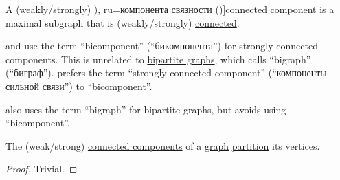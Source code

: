 \begin{definition}\label{def:graph_connected_component}
  A (weakly/strongly) \term[bg=компонента (\cite[15]{Мирчев2001Графи}), ru=компонента связности (\cite[286]{БелоусовТкачёв2004ДискретнаяМатематика})]{connected component} is a maximal subgraph that is (weakly/strongly) \hyperref[def:graph_connectedness]{connected}.
\end{definition}
\begin{comments}
  \item {} and  use the term \enquote{bicomponent} (\enquote{бикомпонента}) for strongly connected components. This is unrelated to \hyperref[def:multipartite_graph]{bipartite graphs}, which  calls \enquote{bigraph} (\enquote{биграф}).  prefers the term \enquote{strongly connected component} (\enquote{компоненты сильной связи}) to \enquote{bicomponent}.

   also uses the term \enquote{bigraph} for bipartite graphs, but avoids using \enquote{bicomponent}.
\end{comments}

\begin{proposition}\label{thm:connected_components_partition_graph}
  The (weak/strong) \hyperref[def:graph_connected_component]{connected components} of a \hyperref[rem:arbitrary_kind_graph]{graph} \hyperref[def:set_partition]{partition} its vertices.
\end{proposition}
\begin{proof}
  Trivial.
\end{proof}

